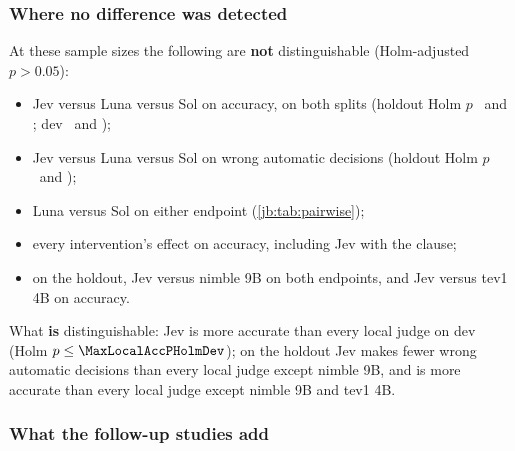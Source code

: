 \subsubsection{Where no difference was detected}

At these sample sizes the following are \textbf{not} distinguishable (Holm-adjusted $p > 0.05$):
\begin{itemize}
  \item Jev versus Luna versus Sol on accuracy, on both splits (holdout Holm $p$ \LunaHoldRAccPHolm\ and
    \SolHoldRAccPHolm; dev \LunaDevRAccPHolm\ and \SolDevRAccPHolm);
  \item Jev versus Luna versus Sol on wrong automatic decisions (holdout Holm $p$ \LunaHoldRWaPHolm\ and
    \SolHoldRWaPHolm);
  \item Luna versus Sol on either endpoint (\cref{jb:tab:pairwise});
  \item every intervention's effect on accuracy, including Jev with the clause;
  \item on the holdout, Jev versus nimble 9B on both endpoints, and Jev versus tev1 4B on accuracy.
\end{itemize}
What \textbf{is} distinguishable: Jev is more accurate than every local judge on dev (Holm $p \le
\MaxLocalAccPHolmDev$); on the holdout Jev makes fewer wrong automatic decisions than every local judge
except nimble 9B, and is more accurate than every local judge except nimble 9B and tev1 4B.

\subsubsection{What the follow-up studies add}\label{jb:sec:recs-followup}

